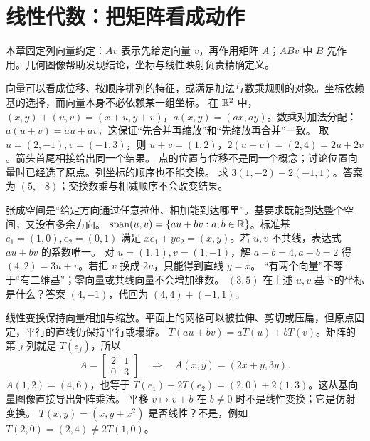 \chapter{线性代数：把矩阵看成动作}
本章固定列向量约定：$Av$ 表示先给定向量 $v$，再作用矩阵 $A$；$ABv$ 中 $B$ 先作用。几何图像帮助发现结论，坐标与线性映射负责精确定义。

\idea 向量可以看成位移、按顺序排列的特征，或满足加法与数乘规则的对象。坐标依赖基的选择，而向量本身不必依赖某一组坐标。
\mathpart 在 $\mathbb R^2$ 中，$(x,y)+(u,v)=(x+u,y+v)$，$a(x,y)=(ax,ay)$。数乘对加法分配：$a(u+v)=au+av$，这保证“先合并再缩放”和“先缩放再合并”一致。
\examplepart 取 $u=(2,-1),v=(-1,3)$，则 $u+v=(1,2)$，$2(u+v)=(2,4)=2u+2v$。箭头首尾相接给出同一个结果。
\pitfall 点的位置与位移不是同一个概念；讨论位置向量时已经选了原点。列坐标的顺序也不能交换。
\exercise 求 $3(1,-2)-2(-1,1)$。答案为 $(5,-8)$；交换数乘与相减顺序不会改变结果。
\nextlesson

\idea 张成空间是“给定方向通过任意拉伸、相加能到达哪里”。基要求既能到达整个空间，又没有多余方向。
\mathpart $\operatorname{span}(u,v)=\{au+bv:a,b\in\mathbb R\}$。标准基 $e_1=(1,0),e_2=(0,1)$ 满足 $x e_1+y e_2=(x,y)$。若 $u,v$ 不共线，表达式 $au+bv$ 的系数唯一。
\examplepart 对 $u=(1,1),v=(1,-1)$，解 $a+b=4,a-b=2$ 得 $(4,2)=3u+v$。若把 $v$ 换成 $2u$，只能得到直线 $y=x$。
\pitfall “有两个向量”不等于“有二维基”；零向量或共线向量不会增加维数。
\exercise $(3,5)$ 在上述 $u,v$ 基下的坐标是什么？答案 $(4,-1)$，代回为 $(4,4)+(-1,1)$。
\nextlesson

\idea 线性变换保持向量相加与缩放。平面上的网格可以被拉伸、剪切或压扁，但原点固定，平行的直线仍保持平行或塌缩。
\mathpart $T(au+bv)=aT(u)+bT(v)$。矩阵的第 $j$ 列就是 $T(e_j)$，所以
\[A=\begin{bmatrix}2&1\\0&3\end{bmatrix}\quad\Longrightarrow\quad A(x,y)=(2x+y,3y).\]
\examplepart $A(1,2)=(4,6)$，也等于 $T(e_1)+2T(e_2)=(2,0)+2(1,3)$。这从基向量图像直接导出矩阵乘法。
\pitfall 平移 $v\mapsto v+b$ 在 $b\ne0$ 时不是线性变换；它是仿射变换。
\exercise $T(x,y)=(x,y+x^2)$ 是否线性？不是，例如 $T(2,0)=(2,4)\ne2T(1,0)$。
\nextlesson

